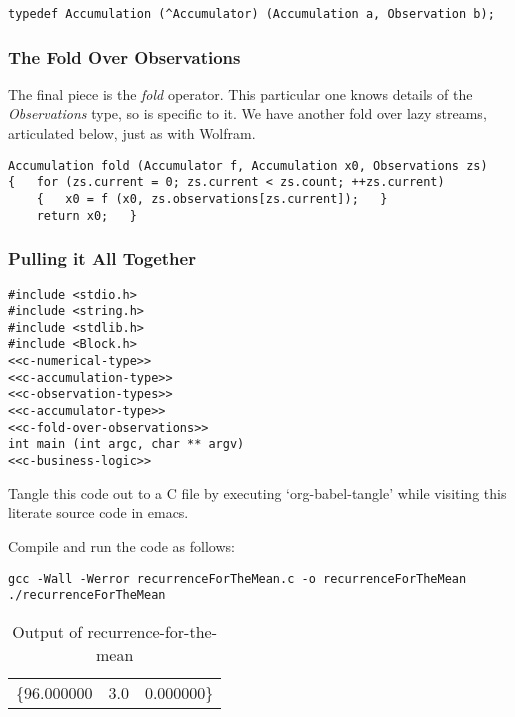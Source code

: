 \documentclass[10pt,oneside,x11names]{article}
\begin{document}
\begin{verbatim}
typedef Accumulation (^Accumulator) (Accumulation a, Observation b);
\end{verbatim}

\subsubsection{The Fold Over Observations}
\label{sec:orgheadline9}

The final piece is the \emph{fold} operator. This particular one knows details of the
\emph{Observations} type, so is specific to it. We have another fold over lazy
streams, articulated below, just as with Wolfram.

\begin{verbatim}
Accumulation fold (Accumulator f, Accumulation x0, Observations zs)
{   for (zs.current = 0; zs.current < zs.count; ++zs.current)
    {   x0 = f (x0, zs.observations[zs.current]);   }
    return x0;   }
\end{verbatim}

\subsubsection{Pulling it All Together}
\label{sec:orgheadline10}

\begin{verbatim}
#include <stdio.h>
#include <string.h>
#include <stdlib.h>
#include <Block.h>
<<c-numerical-type>>
<<c-accumulation-type>>
<<c-observation-types>>
<<c-accumulator-type>>
<<c-fold-over-observations>>
int main (int argc, char ** argv)
<<c-business-logic>>
\end{verbatim}

Tangle this code out to a C file by executing `org-babel-tangle' while
visiting this literate source code in emacs. 

Compile and run the code as follows:

\begin{verbatim}
gcc -Wall -Werror recurrenceForTheMean.c -o recurrenceForTheMean
./recurrenceForTheMean
\end{verbatim}

\begin{table}[htb]
\caption{Output of recurrence-for-the-mean}
\centering
\begin{tabular}{lrl}
\{96.000000 & 3.0 & 0.000000\}\\
\end{tabular}
\end{table}
\end{document}
